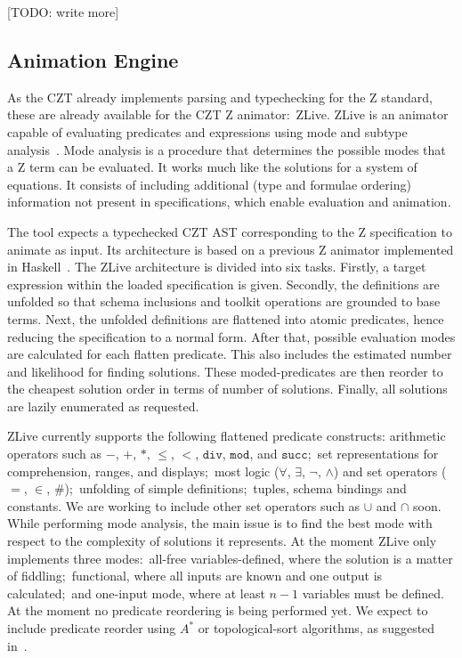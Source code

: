 \documentclass{llncs}
\begin{document}
    [TODO: write more]

\subsection{Animation Engine}

    As the CZT already implements parsing and typechecking for the Z standard,
    these are already available for the CZT Z animator:~ZLive.
    ZLive is an animator capable of evaluating predicates and expressions using
    mode and subtype analysis~\cite{winikooff98}.
    Mode analysis is a procedure that determines the possible modes that a
    Z term can be evaluated. It works much like the solutions for a system of equations.
    It consists of including additional (type and formulae ordering) information not
    present in specifications, which enable evaluation and animation.

    The tool expects a typechecked CZT AST corresponding to the Z specification to animate
    as input. Its architecture is based on a previous Z animator implemented in Haskell~\cite{utting-jaza}.
    The ZLive architecture is divided into six tasks.
    Firstly, a target expression within the loaded specification is given.
    Secondly, the definitions are unfolded so that schema inclusions and toolkit operations
    are grounded to base terms. Next, the unfolded definitions are flattened into atomic
    predicates, hence reducing the specification to a normal form.
    After that, possible evaluation modes are calculated for each flatten predicate.
    This also includes the estimated number and likelihood for finding solutions.
    These moded-predicates are then reorder to the cheapest solution order in terms of
    number of solutions. Finally, all solutions are lazily enumerated as requested.

    ZLive currently supports the following flattened predicate constructs: arithmetic operators
    such as $-$, $+$, $*$, $\leq$, $<$, $\mathtt{div}$, $\mathtt{mod}$, and $\mathtt{succ}$;~set
    representations for comprehension, ranges, and displays;~most logic ($\forall$,
    $\exists$, $\lnot$, $\land$) and set operators ($=$, $\in$, $\#$);~unfolding of simple
    definitions;~tuples, schema bindings and constants.
    We are working to include other set operators such as $\cup$ and $\cap$ soon.
    While performing mode analysis, the main issue is to find the best mode with respect to
    the complexity of solutions it represents. At the moment ZLive only implements three modes:~all-free
    variables-defined, where the solution is a matter of fiddling;~functional, where all inputs are known
    and one output is calculated;~and one-input mode, where at least $n-1$ variables must be defined.
    At the moment no predicate reordering is being performed yet.
    We expect to include predicate reorder using $A^*$ or topological-sort algorithms,
    as suggested in~\cite{winikooff98}.
\end{document}
